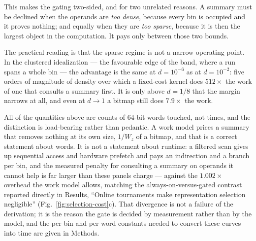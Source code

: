 This makes the gating two-sided, and for two unrelated reasons. A summary must be declined when the
operands are \emph{too dense}, because every bin is occupied and it proves nothing; and equally when
they are \emph{too sparse}, because it is then the largest object in the computation. It pays only
between those two bounds. 

The practical reading is that the sparse regime is not a narrow operating point. In the clustered
idealization --- the favourable edge of the band, where a run spans a whole bin --- the advantage is
the same at $d = 10^{-6}$ as at $d = 10^{-2}$: five orders of magnitude of density over which a
fixed-cost kernel does $512\times$ the work of one that consults a summary first. It is only above
$d = 1/8$ that the margin narrows at all, and even at $d \to 1$ a bitmap still does $7.9\times$ the
work.

All of the quantities above are counts of $64$-bit words touched, not times, and the distinction is
load-bearing rather than pedantic. A work model prices a summary that removes nothing at its own size,
$1/W_z$ of a bitmap, and that is a correct statement about words. It is not a statement about runtime:
a filtered scan gives up sequential access and hardware prefetch and pays an indirection and a branch
per bin, and the measured penalty for consulting a summary on operands it cannot help is far larger
than these panels charge ---  against the $1.002\times$ overhead the work model allows, matching the
always-on-versus-gated contrast reported directly in Results, ``Online tournaments make
representation selection negligible'' (Fig.~\ref{fig:selection-cost}c). That divergence is not a failure of
the derivation; it is the reason the gate is decided by measurement rather than by the model, and the
per-bin and per-word constants needed to convert these curves into time are given in Methods.

\label{note:batch}

